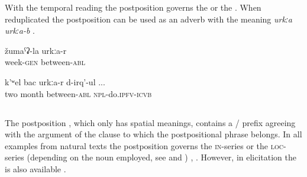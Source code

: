 With the temporal reading the postposition governs the   or the  . When reduplicated the postposition can be used as an adverb with the meaning \textit{urkːa} \textit{urkːa-b} .


\begin{exe}
	\ex
	\begin{xlist}
		\ex	\label{withinoneweek}
		\gll	žumaˁʡ-la	urkːa-r  \\
			week-\textsc{gen}	between-\textsc{abl}\\
		\glt	{}

		\ex	\label{After two months they were doing (the medical treatment again}
		\gll	k'ʷel	bac	urkːa-r	d-irq'-ul ...\\
			two	month	between-\textsc{abl}	\textsc{npl}-do.\textsc{ipfv}-\textsc{icvb}\\
		\glt	{}
	\end{xlist}
\end{exe}



\subsection{ }
\label{ssec:postposition bi}

The postposition , which only has spatial meanings, contains a / prefix agreeing with the  argument of the clause to which the postpositional phrase belongs. In all examples from natural texts the postposition governs the \textsc{in}-series or the \textsc{loc}-series (depending on the noun employed, see  and ) , . However, in elicitation the  is also available .

